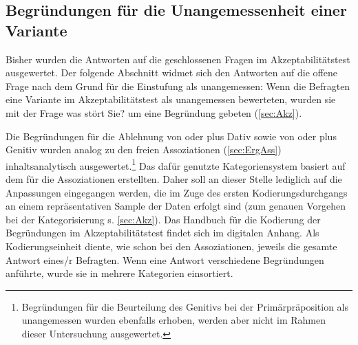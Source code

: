 \subsection{Begründungen für die Unangemessenheit einer Variante}
\label{sec:Begruendungen}
Bisher wurden die Antworten auf die geschlossenen Fragen im Akzeptabilitätstest ausgewertet. 
Der folgende Abschnitt widmet sich den Antworten auf die offene Frage nach dem Grund für die Einstufung als unangemessen: 
Wenn die Befragten eine Variante im Akzeptabilitätstest als unangemessen bewerteten, wurden sie mit der Frage \glqq was stört Sie?\grqq{} um eine Begründung gebeten (\autoref{sec:Akz}). 

Die Begründungen für die Ablehnung von \wegen{} oder \waehrend{} plus Dativ sowie von \dank{} oder \gegenueber{} plus Genitiv wurden analog zu den freien Assoziationen (\autoref{sec:ErgAss}) inhaltsanalytisch ausgewertet.\footnote{Begründungen für die Beurteilung des Genitivs bei der Primärpräposition  als unangemessen wurden ebenfalls erhoben, werden aber nicht im Rahmen dieser Untersuchung ausgewertet.}
Das dafür genutzte Kategoriensystem basiert auf dem für die Assoziationen erstellten. 
Daher soll an dieser Stelle lediglich auf die Anpassungen eingegangen werden, die im Zuge des ersten Kodierungsdurchgangs an einem repräsentativen Sample der Daten erfolgt sind (zum genauen Vorgehen bei der Kategorisierung s. \autoref{sec:Akz}). 
Das Handbuch für die Kodierung der Begründungen im Akzeptabilitätstest findet sich im digitalen Anhang. 
Als Kodierungseinheit diente, wie schon bei den Assoziationen, jeweils die gesamte Antwort eines/r Befragten. 
Wenn eine Antwort verschiedene Begründungen anführte, wurde sie in mehrere Kategorien einsortiert. 

